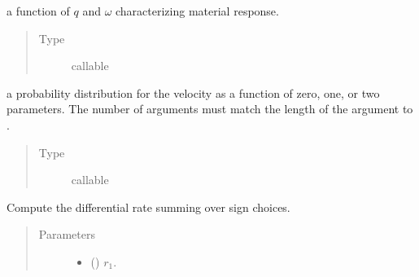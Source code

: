 \documentclass[letterpaper,10pt,english]{sphinxmanual}
\begin{document}
\begin{fulllineitems}
\begin{fulllineitems}
\end{fulllineitems}


\begin{fulllineitems}
\label{\detokenize{code_structure:scdc.initial.distribution.integral.RateIntegrator.response}}
a function of \(q\) and \(\omega\)
characterizing material response.
\begin{quote}\begin{description}
\item[{Type}] \leavevmode
callable

\end{description}\end{quote}

\end{fulllineitems}


\begin{fulllineitems}
\label{\detokenize{code_structure:scdc.initial.distribution.integral.RateIntegrator.vdf}}
a probability distribution for the velocity as a
function of zero, one, or two parameters. The number of arguments
must match the length of the argument  to .
\begin{quote}\begin{description}
\item[{Type}] \leavevmode
callable

\end{description}\end{quote}

\end{fulllineitems}


\begin{fulllineitems}
\label{\detokenize{code_structure:scdc.initial.distribution.integral.RateIntegrator.pdf}}
Compute the differential rate summing over sign choices.
\begin{quote}\begin{description}
\item[{Parameters}] \leavevmode\begin{itemize}
\item {} 
 () \textendash{} \(r_1\).


\end{itemize}
\end{description}
\end{quote}
\end{fulllineitems}
\end{fulllineitems}
\end{document}
